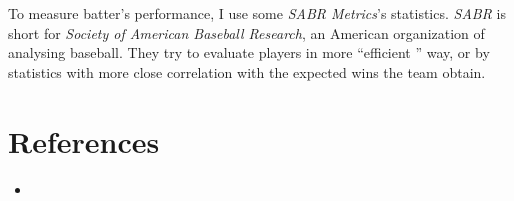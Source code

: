 \documentclass[dvipdfmx]{article}
\begin{document}
To measure batter's performance, I use some \textit{SABR
Metrics}'s statistics. \textit{SABR} is short for \textit{Society
of American Baseball Research}, an American organization of
analysing baseball. They try to evaluate players in more ``efficient ''
way,  or by statistics with more close correlation with the
expected wins the team obtain.

\section{References}
\small
\begin{itemize}
  \item
\end{itemize}
\end{document}
